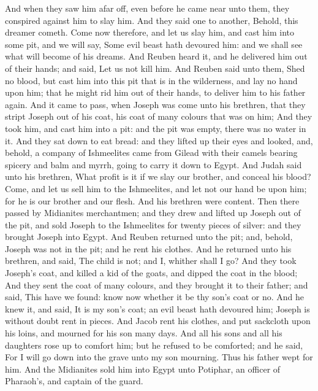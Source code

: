 \begin{biblechapter}
\verse And when they saw him afar off, even before he came near unto them, they conspired against him to slay him.
\verse And they said one to another, Behold, this dreamer cometh.
\verse Come now therefore, and let us slay him, and cast him into some pit, and we will say, Some evil beast hath devoured him: and we shall see what will become of his dreams.
\verse And Reuben heard it, and he delivered him out of their hands; and said, Let us not kill him.
\verse And Reuben said unto them, Shed no blood, but cast him into this pit that is in the wilderness, and lay no hand upon him; that he might rid him out of their hands, to deliver him to his father again.
\verse And it came to pass, when Joseph was come unto his brethren, that they stript Joseph out of his coat, his coat of many colours that was on him;
\verse And they took him, and cast him into a pit: and the pit was empty, there was no water in it.
\verse And they sat down to eat bread: and they lifted up their eyes and looked, and, behold, a company of Ishmeelites came from Gilead with their camels bearing spicery and balm and myrrh, going to carry it down to Egypt.
\verse And Judah said unto his brethren, What profit is it if we slay our brother, and conceal his blood?
\verse Come, and let us sell him to the Ishmeelites, and let not our hand be upon him; for he is our brother and our flesh. And his brethren were content.
\verse Then there passed by Midianites merchantmen; and they drew and lifted up Joseph out of the pit, and sold Joseph to the Ishmeelites for twenty pieces of silver: and they brought Joseph into Egypt.
\verse And Reuben returned unto the pit; and, behold, Joseph was not in the pit; and he rent his clothes.
\verse And he returned unto his brethren, and said, The child is not; and I, whither shall I go?
\verse And they took Joseph's coat, and killed a kid of the goats, and dipped the coat in the blood;
\verse And they sent the coat of many colours, and they brought it to their father; and said, This have we found: know now whether it be thy son's coat or no.
\verse And he knew it, and said, It is my son's coat; an evil beast hath devoured him; Joseph is without doubt rent in pieces.
\verse And Jacob rent his clothes, and put sackcloth upon his loins, and mourned for his son many days.
\verse And all his sons and all his daughters rose up to comfort him; but he refused to be comforted; and he said, For I will go down into the grave unto my son mourning. Thus his father wept for him.
\verse And the Midianites sold him into Egypt unto Potiphar, an officer of Pharaoh's, and captain of the guard.
\end{biblechapter}

